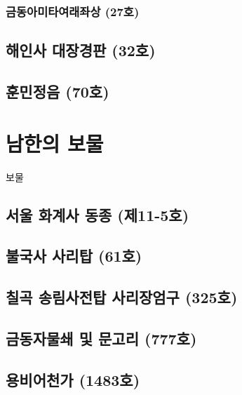 \documentclass[a4paper,11pt]{book}%
\begin{document}
\subsection{금동아미타여래좌상 (27호)}
\section{해인사 대장경판 (32호)}
\section{훈민정음 (70호)}
\chapter{남한의 보물}
보물\cite{k3}
\section{서울 화계사 동종 (제11-5호)}
\section{불국사 사리탑 (61호)}
\section{칠곡 송림사전탑 사리장엄구 (325호)}
\section{금동자물쇄 및 문고리 (777호)}
\section{용비어천가 (1483호)}
\end{document}
